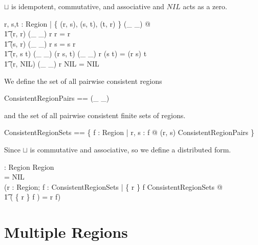 \documentclass[a4paper,9pt]{article}
\begin{document}
$\sqcup$ is idempotent, commutative, and associative and $NIL$ acts as a zero.
\begin{argue}
  \shows \forall r, s,t : Region | \{ (r, s), (s, t), (t, r) \} \subseteq \dom(\_ \sqcup \_) @ \\
\t1 (r, r) \in \dom(\_ \sqcup \_) \land r \sqcup r = r \land \\
\t1 (s, r) \in \dom(\_ \sqcup \_) \land r \sqcup s = s \sqcup r \land \\
\t1 (r, s \sqcup t) \in \dom(\_ \sqcup \_) \land (r \sqcup s, t) \in \dom(\_ \sqcup \_) \land r \sqcup (s \sqcup t) = (r \sqcup s) \sqcup t \land \\
\t1 (r, NIL) \in \dom(\_ \sqcup \_) \land r \sqcup NIL = NIL \\
\end{argue}

We define the set of all pairwise consistent regions
\begin{zed}
  ConsistentRegionPairs == \dom(\_ \sqcup \_) \\
\end{zed}
and the set of all pairwise consistent finite sets of regions.
\begin{zed}
  ConsistentRegionSets == \{ f : \finset Region | \forall r, s : f @ (r, s) \in ConsistentRegionPairs \} \\
\end{zed}

Since $\sqcup$ is commutative and associative, so we define a distributed form.
\begin{axdef}
  \bigsqcup : \finset Region \pfun Region \\
\where
  \bigsqcup \emptyset = NIL \land \\
  (\forall r : Region; f : ConsistentRegionSets | \{ r \} \cup f \in ConsistentRegionSets @ \\
\t1 \bigsqcup( \{ r \} \cup f ) = r \sqcup \bigsqcup f) \\ 
\end{axdef}
  
\clearpage
\section{Multiple Regions}
\label{cha:multiregions}
\end{document}
